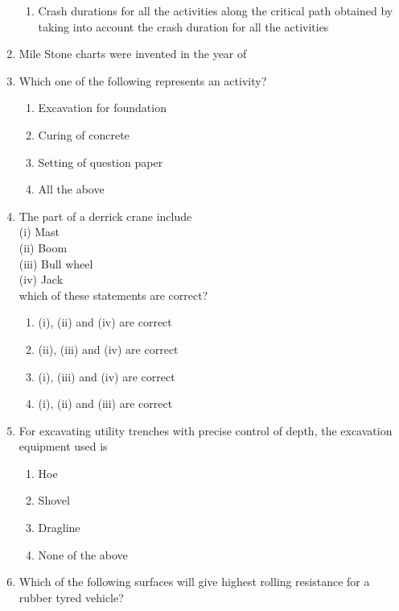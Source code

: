 \documentclass[11pt,a4paper]{article}
\begin{document}
\begin{enumerate}
\begin{enumerate}[label=\Alph*.]
\item{Crash durations for all the activities along the critical path obtained by taking into account the crash duration for all the activities}
\end{enumerate}
\item{Mile Stone charts were invented in the year of}
\\
\item{Which one of the following represents an activity?}
\begin{enumerate}[label=\Alph*.]
\item{Excavation for foundation}
\item{Curing of concrete}
\item{Setting of question paper}
\item{All the above}
\end{enumerate}
\item{The part of a derrick crane include \\
 (i) Mast \\
 (ii) Boom \\
 (iii) Bull wheel \\
 (iv) Jack \\
 which of these statements are correct?}
\begin{enumerate}[label=\Alph*.]
\item{(i), (ii) and (iv) are correct}
\item{(ii), (iii) and (iv) are correct}
\item{(i), (iii) and (iv) are correct}
\item{(i), (ii) and (iii) are correct}
\end{enumerate}
\item{For excavating utility trenches with precise control of depth, the excavation equipment used is}
\begin{enumerate}[label=\Alph*.]
\item{Hoe}
\item{Shovel}
\item{Dragline}
\item{None of the above}
\end{enumerate}
\item{Which of the following surfaces will give highest rolling resistance for a rubber tyred vehicle?}

\end{enumerate}
\end{document}
